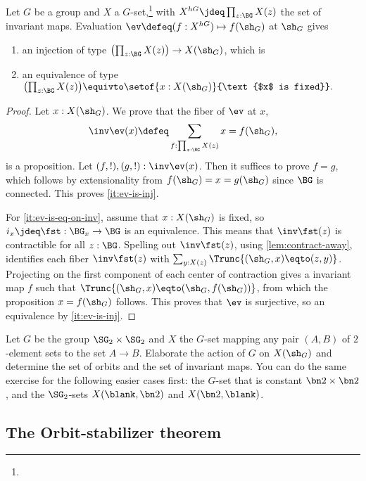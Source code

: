 \begin{lemma}\label{lem:fixpts-are-fixed}
  Let $G$ be a group and $X$ a $G$-set,\footnote{}
  with $X^{hG} \jdeq \prod_{z:\BG}X(z)$
  the set of invariant maps. 
  Evaluation $\ev\defeq(f:X^{hG})\mapsto f(\sh_G)$ at $\sh_G$ gives
  \begin{enumerate}
  \item\label{it:ev-is-inj} 
  an injection of type $\bigl(\prod_{z:\BG}X(z)\bigr) \to X(\sh_G)$, which is
  \item\label{it:ev-is-eq-on-inv} an equivalence of type 
  $\bigl(\prod_{z:\BG}X(z)\bigr) \equivto
  \setof{x : X(\sh_G)}{\text{$x$ is fixed}}.$
  \end{enumerate}
\end{lemma}
\begin{proof}
  Let $x : X(\sh_G)$. We prove that the fiber of $\ev$ at $x$,
  \[
    \inv\ev(x) \defeq \sum_{f : \prod_{z:\BG}X(z)} x=f(\sh_G),
  \]
  is a proposition. Let $(f,!),(g,!) : \inv\ev(x)$. 
  Then it suffices to prove $f=g$, which follows by extensionality
  from $f(\sh_G)=x=g(\sh_G)$ since $\BG$ is connected. This proves
  \ref{it:ev-is-inj}.
  
  For \ref{it:ev-is-eq-on-inv}, assume that
  $x : X(\sh_G)$ is fixed, so $i_x\jdeq\fst:\BG_x \to \BG$
  is an equivalence. This means that $\inv\fst(z)$ is contractible
  for all $z:\BG$. Spelling out $\inv\fst(z)$, using \cref{lem:contract-away},
  identifies each fiber $\inv\fst(z)$ with
  $\sum_{y:X(z)}\Trunc{(\sh_G,x)\eqto(z,y)}$.
  Projecting on the first component of each center of contraction
  gives a invariant map $f$ such that $\Trunc{(\sh_G,x)\eqto(\sh_G,f(\sh_G))}$,
  from which the proposition $x=f(\sh_G)$ follows. This proves that
  $\ev$ is surjective, so an equivalence by \ref{it:ev-is-inj}.
\end{proof}

\begin{xca}\label{xca:Gset-A->B}
Let $G$ be the group $\SG_2\times\SG_2$ and $X$ the $G$-set mapping
any pair $(A,B)$ of $2$-element sets to the set $A\to B$.
Elaborate the action of $G$ on $X(\sh_G)$ and determine the
set of orbits and the set of invariant maps. You can
do the same exercise for the following easier cases first:
the $G$-set that is constant $\bn2\times\bn2$, and
the $\SG_2$-sets $X(\blank,\bn2)$ and $X(\bn2,\blank)$.
\end{xca}

\subsection{The Orbit-stabilizer theorem}

